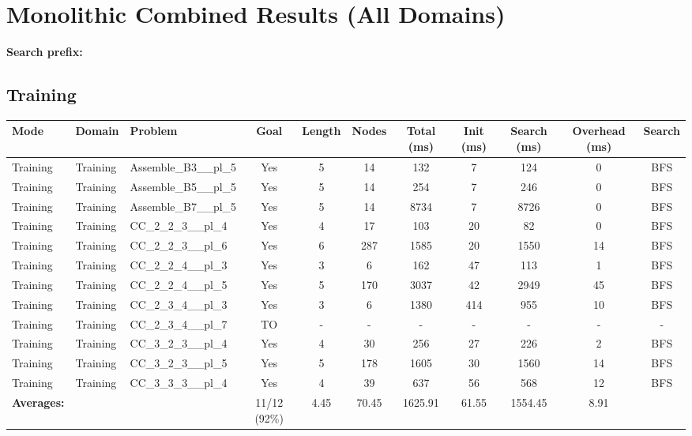 \documentclass{article}
\begin{document}
\section*{Monolithic Combined Results (All Domains)}
\textbf{Search prefix:} 
\\[0.5cm]
\subsection*{Training}
\begin{tabular}{lllcccccccc}
\toprule
Mode & Domain & Problem & Goal & Length & Nodes & Total (ms) & Init (ms) & Search (ms) & Overhead (ms) & Search \\
\midrule
Training & Training & Assemble\_B3\_\_pl\_5 & Yes & 5 & 14 & 132 & 7 & 124 & 0 & BFS \\
Training & Training & Assemble\_B5\_\_pl\_5 & Yes & 5 & 14 & 254 & 7 & 246 & 0 & BFS \\
Training & Training & Assemble\_B7\_\_pl\_5 & Yes & 5 & 14 & 8734 & 7 & 8726 & 0 & BFS \\
Training & Training & CC\_2\_2\_3\_\_pl\_4 & Yes & 4 & 17 & 103 & 20 & 82 & 0 & BFS \\
Training & Training & CC\_2\_2\_3\_\_pl\_6 & Yes & 6 & 287 & 1585 & 20 & 1550 & 14 & BFS \\
Training & Training & CC\_2\_2\_4\_\_pl\_3 & Yes & 3 & 6 & 162 & 47 & 113 & 1 & BFS \\
Training & Training & CC\_2\_2\_4\_\_pl\_5 & Yes & 5 & 170 & 3037 & 42 & 2949 & 45 & BFS \\
Training & Training & CC\_2\_3\_4\_\_pl\_3 & Yes & 3 & 6 & 1380 & 414 & 955 & 10 & BFS \\
Training & Training & CC\_2\_3\_4\_\_pl\_7 & TO & - & - & - & - & - & - & - \\
Training & Training & CC\_3\_2\_3\_\_pl\_4 & Yes & 4 & 30 & 256 & 27 & 226 & 2 & BFS \\
Training & Training & CC\_3\_2\_3\_\_pl\_5 & Yes & 5 & 178 & 1605 & 30 & 1560 & 14 & BFS \\
Training & Training & CC\_3\_3\_3\_\_pl\_4 & Yes & 4 & 39 & 637 & 56 & 568 & 12 & BFS \\
\textbf{Averages:} & & & 11/12 (92\%) & 4.45 & 70.45 & 1625.91 & 61.55 & 1554.45 & 8.91 & \\
\bottomrule
\end{tabular}
\newpage
\end{document}
